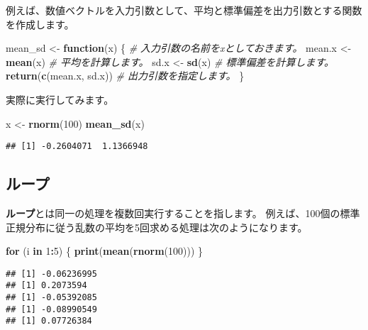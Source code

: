 \documentclass[]{bxjsarticle}
\newenvironment{Shaded}{\begin{snugshade}}{\end{snugshade}}
\newcommand{\CommentTok}[1]{\textcolor[rgb]{0.56,0.35,0.01}{\textit{#1}}}
\newcommand{\ControlFlowTok}[1]{\textcolor[rgb]{0.13,0.29,0.53}{\textbf{#1}}}
\newcommand{\DecValTok}[1]{\textcolor[rgb]{0.00,0.00,0.81}{#1}}
\newcommand{\KeywordTok}[1]{\textcolor[rgb]{0.13,0.29,0.53}{\textbf{#1}}}
\newcommand{\NormalTok}[1]{#1}
\newcommand{\OperatorTok}[1]{\textcolor[rgb]{0.81,0.36,0.00}{\textbf{#1}}}
\newcommand{\StringTok}[1]{\textcolor[rgb]{0.31,0.60,0.02}{#1}}
\begin{document}
例えば、数値ベクトルを入力引数として、平均と標準偏差を出力引数とする関数を作成します。

\begin{Shaded}
\begin{Highlighting}[]
\NormalTok{mean_sd <-}\StringTok{ }\ControlFlowTok{function}\NormalTok{(x) \{ }\CommentTok{# 入力引数の名前をxとしておきます。}
\NormalTok{  mean.x <-}\StringTok{ }\KeywordTok{mean}\NormalTok{(x) }\CommentTok{# 平均を計算します。}
\NormalTok{  sd.x <-}\StringTok{ }\KeywordTok{sd}\NormalTok{(x) }\CommentTok{# 標準偏差を計算します。}
  \KeywordTok{return}\NormalTok{(}\KeywordTok{c}\NormalTok{(mean.x, sd.x)) }\CommentTok{# 出力引数を指定します。}
\NormalTok{\}}
\end{Highlighting}
\end{Shaded}

実際に実行してみます。

\begin{Shaded}
\begin{Highlighting}[]
\NormalTok{x <-}\StringTok{ }\KeywordTok{rnorm}\NormalTok{(}\DecValTok{100}\NormalTok{)}
\KeywordTok{mean_sd}\NormalTok{(x)}
\end{Highlighting}
\end{Shaded}

\begin{verbatim}
## [1] -0.2604071  1.1366948
\end{verbatim}

\hypertarget{ux30ebux30fcux30d7}{%
\subsection{ループ}\label{ux30ebux30fcux30d7}}

\textbf{ループ}とは同一の処理を複数回実行することを指します。
例えば、100個の標準正規分布に従う乱数の平均を5回求める処理は次のようになります。

\begin{Shaded}
\begin{Highlighting}[]
\ControlFlowTok{for}\NormalTok{ (i }\ControlFlowTok{in} \DecValTok{1}\OperatorTok{:}\DecValTok{5}\NormalTok{) \{}
  \KeywordTok{print}\NormalTok{(}\KeywordTok{mean}\NormalTok{(}\KeywordTok{rnorm}\NormalTok{(}\DecValTok{100}\NormalTok{)))}
\NormalTok{\}}
\end{Highlighting}
\end{Shaded}

\begin{verbatim}
## [1] -0.06236995
## [1] 0.2073594
## [1] -0.05392085
## [1] -0.08990549
## [1] 0.07726384
\end{verbatim}
\end{document}
